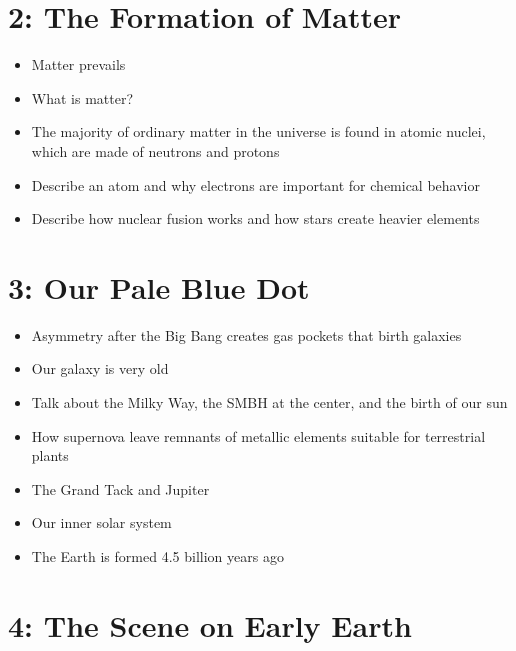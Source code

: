 \documentclass[
]{report}
\providecommand{\tightlist}{%
  \setlength{\itemsep}{0pt}\setlength{\parskip}{0pt}}
\providecommand{\tightlist}{%
  \setlength{\itemsep}{0pt}\setlength{\parskip}{0pt}}
\begin{document}
\hypertarget{the-formation-of-matter}{%
\section*{2: The Formation of Matter}\label{the-formation-of-matter}}

\begin{itemize}
\tightlist
\item
  Matter prevails
\item
  What is matter?
\item
  The majority of ordinary matter in the universe is found in atomic nuclei, which are made of neutrons and protons
\item
  Describe an atom and why electrons are important for chemical behavior
\item
  Describe how nuclear fusion works and how stars create heavier elements
\end{itemize}

\hypertarget{our-pale-blue-dot}{%
\section*{3: Our Pale Blue Dot}\label{our-pale-blue-dot}}

\begin{itemize}
\tightlist
\item
  Asymmetry after the Big Bang creates gas pockets that birth galaxies
\item
  Our galaxy is very old
\item
  Talk about the Milky Way, the SMBH at the center, and the birth of our sun
\item
  How supernova leave remnants of metallic elements suitable for terrestrial plants
\item
  The Grand Tack and Jupiter
\item
  Our inner solar system
\item
  The Earth is formed 4.5 billion years ago
\end{itemize}

\hypertarget{the-scene-on-early-earth}{%
\section*{4: The Scene on Early Earth}\label{the-scene-on-early-earth}}
\end{document}

